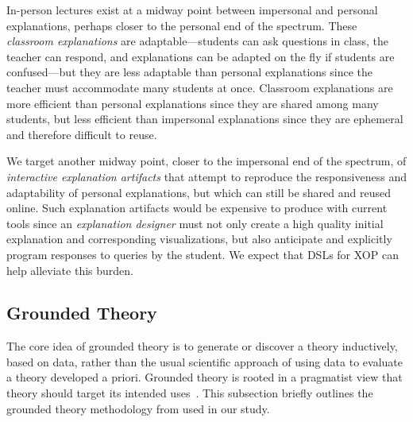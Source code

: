 \documentclass[sigconf]{acmart}
\begin{document}
In-person lectures exist at a midway point between impersonal and personal
explanations, perhaps closer to the personal end of the spectrum. These
\emph{classroom explanations} are adaptable---students can ask questions in
class, the teacher can respond, and explanations can be adapted on the fly if
students are confused---but they are less adaptable than personal explanations
since the teacher must accommodate many students at once. Classroom
explanations are more efficient than personal explanations since they are
shared among many students, but less efficient than impersonal explanations
since they are ephemeral and therefore difficult to reuse.


We target another midway point, closer to the impersonal end of the spectrum,
of \emph{interactive explanation artifacts} that attempt to reproduce the
responsiveness and adaptability of personal explanations, but which can still
be shared and reused online. Such explanation artifacts would be expensive to
produce with current tools since an \emph{explanation designer} must not only
create a high quality initial explanation and corresponding visualizations, but
also anticipate and explicitly program responses to queries by the student.
%
We expect that DSLs for XOP can help alleviate this burden.


\subsection{Grounded Theory}
\label{sec:back:gt}

The core idea of grounded theory is to generate or discover a theory
inductively, based on data, rather than the usual scientific approach of using
data to evaluate a theory developed a priori. 
%
Grounded theory is rooted in a pragmatist view that theory should target
its intended uses~\cite{Strauss67discoveryof}.
%
%
%
%
This subsection briefly outlines the grounded theory methodology from
\citet{corbin2014basics} used in our study.
\end{document}
